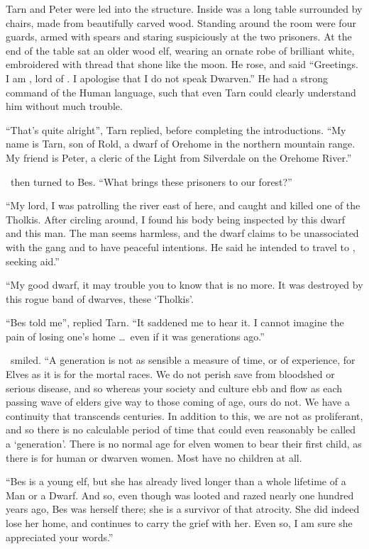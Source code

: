 Tarn and Peter were led into the structure.  Inside was a long table surrounded by chairs, made from beautifully carved wood.  Standing around the room were four guards, armed with spears and staring suspiciously at the two prisoners.  At the end of the table sat an older wood elf, wearing an ornate robe of brilliant white, embroidered with thread that shone like the moon.  He rose, and said ``Greetings.  I am \arilor, lord of \inarthonor.  I apologise that I do not speak Dwarven.''  He had a strong command of the Human language, such that even Tarn could clearly understand him without much trouble.

``That's quite alright'', Tarn replied, before completing the introductions.  ``My name is Tarn, son of Rold, a dwarf of Orehome in the northern mountain range.  My friend is Peter, a cleric of the Light from Silverdale on the Orehome River.''

\arilor\ then turned to Bes. ``What brings these prisoners to our forest?''

``My lord, I was patrolling the river east of here, and caught and killed one of the Tholkis.  After circling around, I found his body being inspected by this dwarf and this man.  The man seems harmless, and the dwarf claims to be unassociated with the gang and to have peaceful intentions.  He said he intended to travel to \yedmurdim, seeking aid.''

``My good dwarf, it may trouble you to know that \yedmurdim is no more.  It was destroyed by this rogue band of dwarves, these `Tholkis'.

``Bes told me'', replied Tarn.  ``It saddened me to hear it.  I cannot imagine the pain of losing one's home \ldots\ even if it was generations ago.''

\arilor\ smiled.  ``A generation is not as sensible a measure of time, or of experience, for Elves as it is for the mortal races.  We do not perish save from bloodshed or serious disease, and so whereas your society and culture ebb and flow as each passing wave of elders give way to those coming of age, ours do not.  We have a continuity that transcends centuries.  In addition to this, we are not as proliferant, and so there is no calculable period of time that could even reasonably be called a `generation'.  There is no normal age for elven women to bear their first child, as there is for human or dwarven women.  Most have no children at all.

``Bes is a young elf, but she has already lived longer than a whole lifetime of a Man or a Dwarf.  And so, even though \yedmurdim was looted and razed nearly one hundred years ago, Bes was herself there; she is a survivor of that atrocity.  She did indeed lose her home, and continues to carry the grief with her.  Even so, I am sure she appreciated your words.''

